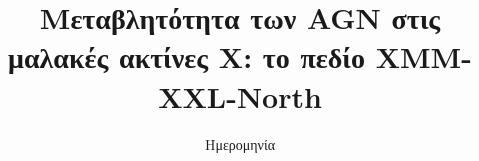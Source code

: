 \documentclass[a4paper, 11pt, oneside]{Thesis}  %
\begin{document}
	
	\frontmatter      %
	
	\title  {Μεταβλητότητα των \textlatin{AGN} στις μαλακές ακτίνες Χ: το πεδίο \textlatin{XMM-XXL-North}}
	
	\addresses  {\groupname\\\deptname\\\univname}  %
	\date       {Ημερομηνία}
	\subject    {}
	\keywords   {}
	
	\maketitle
	
	
	
	\fancyhead{}  %
	\rhead{\thepage}  %
	\lhead{}  %
	
	\pagestyle{fancy}  %
	
	
	
	\pagestyle{empty}  %
	
	
	\blankpage
	
	\clearpage  %
	
\end{document}
